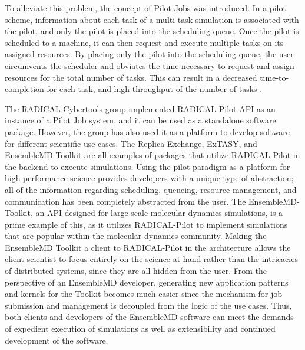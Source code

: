 \documentclass[]{article}
\begin{document}
		To alleviate this problem, the concept of Pilot-Jobs was introduced. In a pilot scheme, information about each task of a multi-task simulation is associated with the pilot, and only the pilot is placed into the scheduling queue. Once the pilot is scheduled to a machine, it can then request and execute multiple tasks on its assigned resources. By placing only the pilot into the scheduling queue, the user circumvents the scheduler and obviates the time necessary to request and assign resources for the total number of tasks. This can result in a decreased time-to-completion for each task, and high throughput of the number of tasks \cite{rp_paper}.

		The RADICAL-Cybertools group implemented RADICAL-Pilot API as an instance of a Pilot Job system, and it can be used as a standalone software package. However, the group has also used it as a platform to develop software for different scientific use cases. The Replica Exchange, ExTASY, and EnsembleMD Toolkit are all examples of packages that utilize RADICAL-Pilot in the backend to execute simulations. Using the pilot paradigm as a platform for high performance science provides developers with a unique type of abstraction; all of the information regarding scheduling, queueing, resource management, and communication has been completely abstracted from the user. The EnsembleMD-Toolkit, an API designed for large scale molecular dynamics simulations, is a prime example of this, as it utilizes RADICAL-Pilot to implement simulations that are popular within the molecular dynamics community. Making the EnsembleMD Toolkit a client to RADICAL-Pilot in the architecture allows the client scientist to focus entirely on the science at hand rather than the intricacies of distributed systems, since they are all hidden from the user. From the perspective of an EnsembleMD developer, generating new application patterns and kernels for the Toolkit becomes much easier since the mechanism for job submission and management is decoupled from the logic of the use cases. Thus, both clients and developers of the EnsembleMD software can meet the demands of expedient execution of simulations as well as extensibility and continued development of the software.
\end{document}
